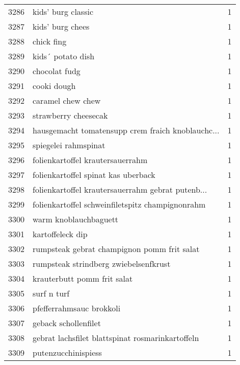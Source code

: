 \begin{tabular}{llr}
3286 &                                 kids’ burg classic &      1 \\
3287 &                                   kids’ burg chees &      1 \\
3288 &                                         chick fing &      1 \\
3289 &                                  kids´ potato dish &      1 \\
3290 &                                      chocolat fudg &      1 \\
3291 &                                        cooki dough &      1 \\
3292 &                                  caramel chew chew &      1 \\
3293 &                               strawberry cheesecak &      1 \\
3294 &  hausgemacht tomatensupp crem fraich knoblauchc... &      1 \\
3295 &                               spiegelei rahmspinat &      1 \\
3296 &                   folienkartoffel krautersauerrahm &      1 \\
3297 &                folienkartoffel spinat kas uberback &      1 \\
3298 &  folienkartoffel krautersauerrahm gebrat putenb... &      1 \\
3299 &   folienkartoffel schweinfiletspitz champignonrahm &      1 \\
3300 &                              warm knoblauchbaguett &      1 \\
3301 &                                   kartoffeleck dip &      1 \\
3302 &        rumpsteak gebrat champignon pomm frit salat &      1 \\
3303 &              rumpsteak strindberg zwiebelsenfkrust &      1 \\
3304 &                        krauterbutt pomm frit salat &      1 \\
3305 &                                        surf n turf &      1 \\
3306 &                           pfefferrahmsauc brokkoli &      1 \\
3307 &                               geback schollenfilet &      1 \\
3308 &   gebrat lachsfilet blattspinat rosmarinkartoffeln &      1 \\
3309 &                                putenzucchinispiess &      1 \\

\end{tabular}
